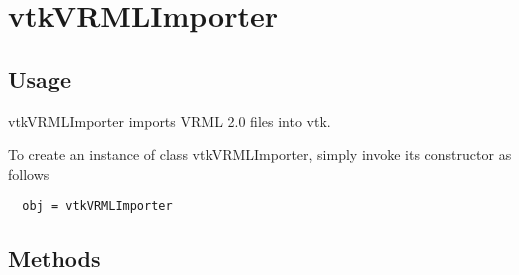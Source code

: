 \section{vtkVRMLImporter}

\subsection{Usage}


 vtkVRMLImporter imports VRML 2.0 files into vtk.

To create an instance of class vtkVRMLImporter, simply
invoke its constructor as follows
\begin{verbatim}
  obj = vtkVRMLImporter
\end{verbatim}
\subsection{Methods}

